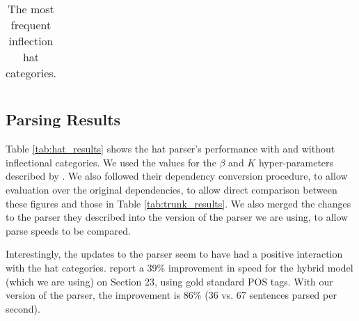 \documentclass[11pt]{article}
\begin{document}
\begin{table}
\begin{tabular}{rc}
\hline
\end{tabular}
\caption{\small The most frequent inflection hat categories.\label{tab:inflection_hat_cats}}
\vspace{-.5in}
\end{table}

\subsection{Parsing Results}



Table \ref{tab:hat_results} shows the hat parser's performance with and without
inflectional categories. We used the values for the $\beta$ and $K$
hyper-parameters described by \citet{honnibal:09}. We also followed their
dependency conversion procedure, to allow evaluation over the original \ccgbank
dependencies, to allow direct comparison between these figures and those in
Table \ref{tab:trunk_results}. We also merged the changes to the parser they
described into the version of the \candc parser we are using, to allow parse speeds
to be compared.

Interestingly, the updates to the \candc parser seem to have had a positive
interaction with the hat categories. \citeauthor{honnibal:09} report a 39\% improvement
in speed for the hybrid model (which we are using) on Section 23, using gold standard
POS tags. With our version of the parser, the improvement is 86\%
(36 vs. 67 sentences parsed per second).
\end{document}

